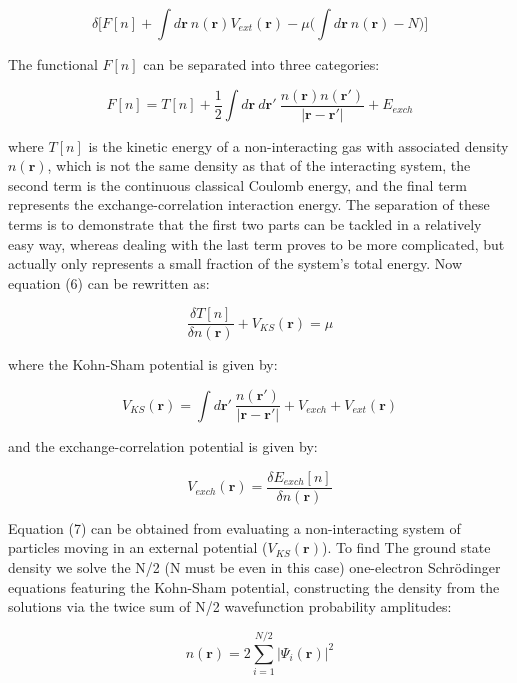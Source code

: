 \documentclass[10pt]{article}
\begin{document}
\begin{equation}
	\delta\biggr[F[n]+\int d\mathbf{r} \ n(\mathbf{r})V_{ext}(\mathbf{r}) - \mu\biggr(\int d\mathbf{r} \ n(\mathbf{r}) - N\biggr)\biggr]
\end{equation}

The functional $F[n]$ can be separated into three categories:

\begin{equation*}
	F[n] = T[n]+\frac{1}{2}\int d\mathbf{r} \ d\mathbf{r}' \ \frac{n(\mathbf{r})n(\mathbf{r}')}{|\mathbf{r}-\mathbf{r}'|}+E_{exch}
\end{equation*}

where $T[n]$ is the kinetic energy of a non-interacting gas with associated density $n(\mathbf{r})$, which is not the same density as that of the interacting system, the second term is the continuous classical Coulomb energy, and the final term represents the exchange-correlation interaction energy. The separation of these terms is to demonstrate that the first two parts can be tackled in a relatively easy way, whereas dealing with the last term proves to be more complicated, but actually only represents a small fraction of the system's total energy. Now equation (6) can be rewritten as:

\begin{equation}
	\frac{\delta T[n]}{\delta n(\mathbf{r})} + V_{KS}(\mathbf{r}) = \mu
\end{equation}

where the Kohn-Sham potential is given by:

\begin{equation*}
	V_{KS}(\mathbf{r}) = \int d\mathbf{r}' \ \frac{n(\mathbf{r}')}{|\mathbf{r}-\mathbf{r}'|}+V_{exch}+V_{ext}(\mathbf{r})
\end{equation*}

and the exchange-correlation potential is given by:

$$V_{exch}(\mathbf{r}) = \frac{\delta E_{exch}[n]}{\delta n(\mathbf{r})}$$

Equation (7) can be obtained from evaluating a non-interacting system of particles moving in an external potential ($V_{KS}(\mathbf{r})$). To find The ground state density we solve the N/2 (N must be even in this case) one-electron Schrödinger equations featuring the Kohn-Sham potential, constructing the density from the solutions via the twice sum of N/2 wavefunction probability amplitudes:

$$n(\mathbf{r}) = 2\sum_{i=1}^{N/2}|\Psi_i(\mathbf{r})|^2$$
\end{document}

